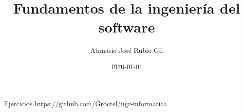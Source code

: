 \documentclass[10pt]{report}
\author{Atanasio José Rubio Gil}
\title{Fundamentos de la ingeniería del software}
\date{\today}
\begin{document}
            {Ejercicios}
            {https://github.com/Groctel/ugr-informatica}
\tableofcontents


\end{document}
